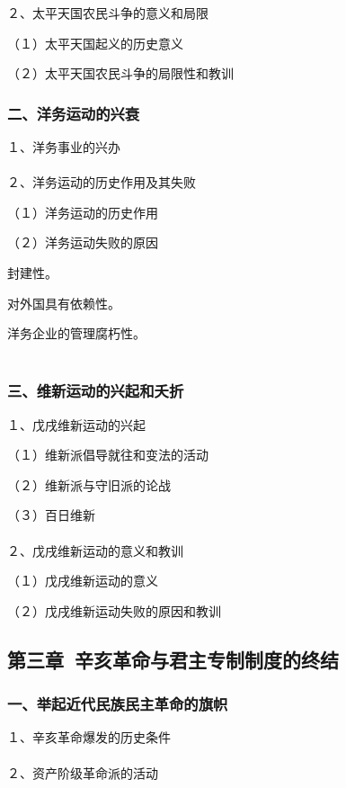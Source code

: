 \documentclass{ctexart}
\begin{document}
２、太平天国农民斗争的意义和局限

（１）太平天国起义的历史意义

（２）太平天国农民斗争的局限性和教训

\subsubsection{二、洋务运动的兴衰}

１、洋务事业的兴办　
\\\\


２、洋务运动的历史作用及其失败

（１）洋务运动的历史作用

（２）洋务运动失败的原因

封建性。

对外国具有依赖性。

洋务企业的管理腐朽性。
\\\\


\subsubsection{三、维新运动的兴起和夭折}

１、戊戌维新运动的兴起

（１）维新派倡导就往和变法的活动

（２）维新派与守旧派的论战

（３）百日维新
\\\\

２、戊戌维新运动的意义和教训

（１）戊戌维新运动的意义

（２）戊戌维新运动失败的原因和教训

\subsection{第三章\ 辛亥革命与君主专制制度的终结}

\subsubsection{一、举起近代民族民主革命的旗帜}

１、辛亥革命爆发的历史条件
\\\\

２、资产阶级革命派的活动
\\\\
\end{document}
